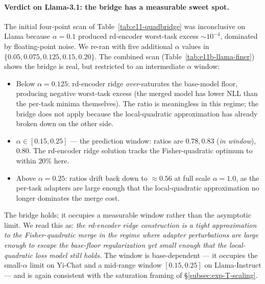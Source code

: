 \paragraph{Verdict on Llama-3.1: the bridge has a measurable
sweet spot.}
The initial four-point scan of Table~\ref{tab:e11-quadbridge} was
inconclusive on Llama because $\alpha = 0.1$ produced rd-encoder
worst-task excess $\sim 10^{-4}$, dominated by floating-point noise.
We re-ran with five additional $\alpha$ values in
$\{0.05, 0.075, 0.125, 0.15, 0.20\}$. The combined scan
(Table~\ref{tab:e11b-llama-finer}) shows the bridge is real, but
restricted to an intermediate $\alpha$ window:
\begin{itemize}
\item Below $\alpha = 0.125$: rd-encoder ridge \emph{over}-saturates
  the base-model floor, producing negative worst-task excess (the
  merged model has lower NLL than the per-task minima themselves).
  The ratio is meaningless in this regime; the bridge does not apply
  because the local-quadratic approximation has already broken down
  on the other side.
\item $\alpha \in [0.15, 0.25]$ ---  the prediction window: ratios
  are $0.78, 0.83$ (\emph{in window}), $0.80$. The rd-encoder ridge
  solution tracks the Fisher-quadratic optimum to within $20\%$
  here.
\item Above $\alpha = 0.25$: ratios drift back down to
$\approx 0.56$ at full scale $\alpha = 1.0$, as the per-task
adapters are large enough that the local-quadratic approximation no
longer dominates the merge cost.
\end{itemize}
The bridge holds; it occupies a measurable window rather than the
asymptotic limit. We read this as: \emph{the rd-encoder ridge
construction is a tight approximation to the Fisher-quadratic merge
in the regime where adapter perturbations are large enough to escape
the base-floor regularization yet small enough that the
local-quadratic loss model still holds.} The window is base-dependent
--- it occupies the small-$\alpha$ limit on Yi-Chat and a mid-range
window $[0.15, 0.25]$ on Llama-Instruct --- and is again consistent
with the saturation framing of \S\ref{subsec:exp-T-scaling}.

